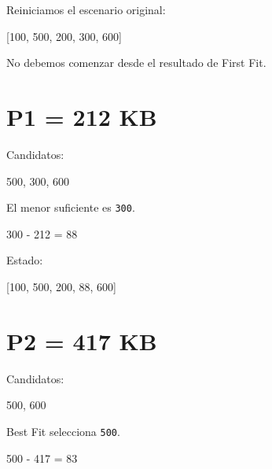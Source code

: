 \documentclass[
  spanish,
  letterpaper,
]{scrbook}
\newenvironment{Shaded}{\begin{snugshade}}{\end{snugshade}}
\newcommand{\NormalTok}[1]{\textcolor[rgb]{0.00,0.23,0.31}{#1}}
\begin{document}
Reiniciamos el escenario original:

\begin{Shaded}
\begin{Highlighting}[]
\NormalTok{[100, 500, 200, 300, 600]}
\end{Highlighting}
\end{Shaded}

No debemos comenzar desde el resultado de First Fit.

\section{P1 = 212 KB}\label{p1-212-kb-4}

Candidatos:

\begin{Shaded}
\begin{Highlighting}[]
\NormalTok{500, 300, 600}
\end{Highlighting}
\end{Shaded}

El menor suficiente es \texttt{300}.

\begin{Shaded}
\begin{Highlighting}[]
\NormalTok{300 {-} 212 = 88}
\end{Highlighting}
\end{Shaded}

Estado:

\begin{Shaded}
\begin{Highlighting}[]
\NormalTok{[100, 500, 200, 88, 600]}
\end{Highlighting}
\end{Shaded}

\section{P2 = 417 KB}\label{p2-417-kb-4}

Candidatos:

\begin{Shaded}
\begin{Highlighting}[]
\NormalTok{500, 600}
\end{Highlighting}
\end{Shaded}

Best Fit selecciona \texttt{500}.

\begin{Shaded}
\begin{Highlighting}[]
\NormalTok{500 {-} 417 = 83}
\end{Highlighting}
\end{Shaded}
\end{document}
